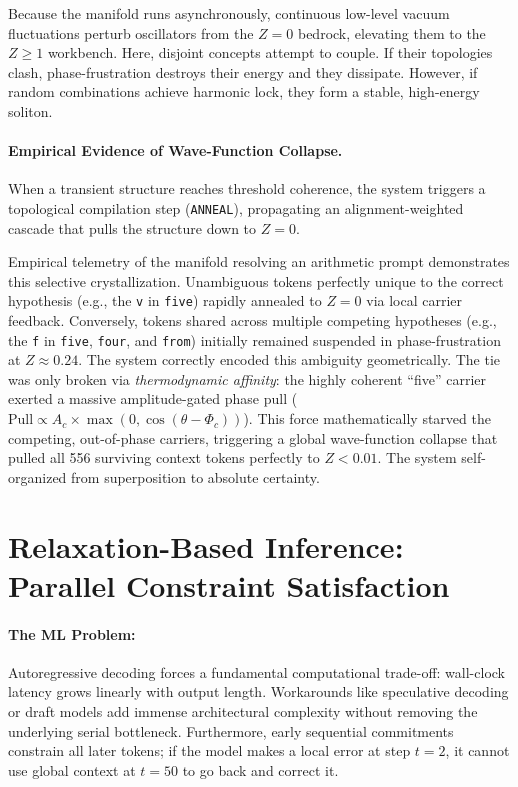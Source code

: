 \documentclass[11pt,a4paper]{article}
\begin{document}
Because the manifold runs asynchronously, continuous low-level vacuum fluctuations perturb oscillators from the $Z=0$ bedrock, elevating them to the $Z \ge 1$ workbench. Here, disjoint concepts attempt to couple. If their topologies clash, phase-frustration destroys their energy and they dissipate. However, if random combinations achieve harmonic lock, they form a stable, high-energy soliton. 

\paragraph{Empirical Evidence of Wave-Function Collapse.}
When a transient structure reaches threshold coherence, the system triggers a topological compilation step (\texttt{ANNEAL}), propagating an alignment-weighted cascade that pulls the structure down to $Z=0$. 

Empirical telemetry of the manifold resolving an arithmetic prompt demonstrates this selective crystallization. Unambiguous tokens perfectly unique to the correct hypothesis (e.g., the \texttt{v} in \texttt{five}) rapidly annealed to $Z=0$ via local carrier feedback. Conversely, tokens shared across multiple competing hypotheses (e.g., the \texttt{f} in \texttt{five}, \texttt{four}, and \texttt{from}) initially remained suspended in phase-frustration at $Z \approx 0.24$. The system correctly encoded this ambiguity geometrically. The tie was only broken via \emph{thermodynamic affinity}: the highly coherent ``five'' carrier exerted a massive amplitude-gated phase pull ($\text{Pull} \propto A_c \times \max(0, \cos(\theta - \Phi_c))$). This force mathematically starved the competing, out-of-phase carriers, triggering a global wave-function collapse that pulled all 556 surviving context tokens perfectly to $Z < 0.01$. The system self-organized from superposition to absolute certainty.





\section{Relaxation-Based Inference: Parallel Constraint Satisfaction}
\label{sec:crystallization}

\paragraph{The ML Problem:} 
Autoregressive decoding forces a fundamental computational trade-off: wall-clock latency grows linearly with output length. Workarounds like speculative decoding or draft models add immense architectural complexity without removing the underlying serial bottleneck. Furthermore, early sequential commitments constrain all later tokens; if the model makes a local error at step $t=2$, it cannot use global context at $t=50$ to go back and correct it.
\end{document}
